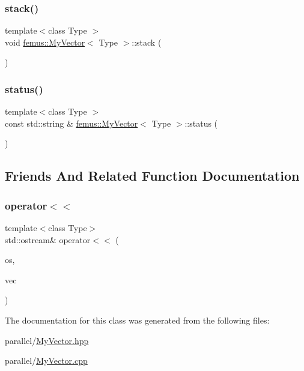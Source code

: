 \mbox{\label{classfemus_1_1_my_vector_a59b340154f7d4e8a5ab2b9385bdbab25}} 
\subsubsection{\texorpdfstring{stack()}{stack()}}
{\footnotesize\ttfamily template$<$class Type $>$ \\
void \mbox{\hyperlink{classfemus_1_1_my_vector}{femus\+::\+My\+Vector}}$<$ Type $>$\+::stack (\begin{DoxyParamCaption}{ }\end{DoxyParamCaption})}

\mbox{\label{classfemus_1_1_my_vector_a84b07a82306c5be7bbedb104eae78c35}} 
\subsubsection{\texorpdfstring{status()}{status()}}
{\footnotesize\ttfamily template$<$class Type $>$ \\
const std\+::string \& \mbox{\hyperlink{classfemus_1_1_my_vector}{femus\+::\+My\+Vector}}$<$ Type $>$\+::status (\begin{DoxyParamCaption}{ }\end{DoxyParamCaption})}



\subsection{Friends And Related Function Documentation}
\mbox{\label{classfemus_1_1_my_vector_af9c47e2b5e5c74df5f660672e9b9a923}} 
\subsubsection{\texorpdfstring{operator$<$$<$}{operator<<}}
{\footnotesize\ttfamily template$<$class Type$>$ \\
std\+::ostream\& operator$<$$<$ (\begin{DoxyParamCaption}\item[{std\+::ostream \&}]{os,  }\item[{\mbox{\hyperlink{classfemus_1_1_my_vector}{My\+Vector}}$<$ Type $>$ \&}]{vec }\end{DoxyParamCaption})\hspace{0.3cm}{\ttfamily [friend]}}



The documentation for this class was generated from the following files\+:\begin{DoxyCompactItemize}
\item 
parallel/\mbox{\hyperlink{_my_vector_8hpp}{My\+Vector.\+hpp}}\item 
parallel/\mbox{\hyperlink{_my_vector_8cpp}{My\+Vector.\+cpp}}\end{DoxyCompactItemize}
